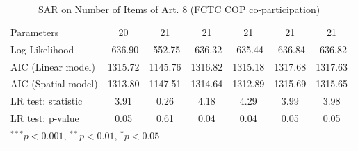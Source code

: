 \begin{table}[!h]
\begin{center}
\begin{tabular}{l c c c c c c }
Parameters              & 20           & 21           & 21           & 21           & 21           & 21           \\
Log Likelihood          & -636.90      & -552.75      & -636.32      & -635.44      & -636.84      & -636.82      \\
AIC (Linear model)      & 1315.72      & 1145.76      & 1316.82      & 1315.18      & 1317.68      & 1317.63      \\
AIC (Spatial model)     & 1313.80      & 1147.51      & 1314.64      & 1312.89      & 1315.69      & 1315.65      \\
LR test: statistic      & 3.91         & 0.26         & 4.18         & 4.29         & 3.99         & 3.98         \\
LR test: p-value        & 0.05         & 0.61         & 0.04         & 0.04         & 0.05         & 0.05         \\
\bottomrule
\multicolumn{7}{l}{\scriptsize{$^{***}p<0.001$, $^{**}p<0.01$, $^*p<0.05$}}
\end{tabular}
\caption{SAR on Number of Items of Art. 8 (FCTC COP co-participation)}
\label{table:coefficients}
\end{center}
\end{table}
